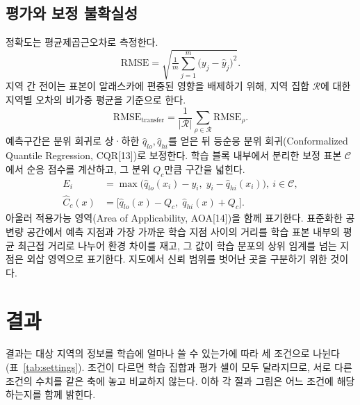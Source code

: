\documentclass[10pt,twocolumn]{article}
\begin{document}
\subsection{평가와 보정 불확실성}
정확도는 평균제곱근오차로 측정한다.
\begin{equation}
\mathrm{RMSE}=\sqrt{\tfrac1m\sum_{j=1}^{m}\big(y_j-\hat y_j\big)^2}.
\label{eq:rmse}
\end{equation}
지역 간 전이는 표본이 알래스카에 편중된 영향을 배제하기 위해, 지역 집합 $\mathcal R$에 대한 지역별 오차의 비가중 평균을 기준으로 한다.
\begin{equation}
\mathrm{RMSE}_{\mathrm{transfer}}=\frac{1}{|\mathcal R|}\sum_{\rho\in\mathcal R}\mathrm{RMSE}_{\rho}.
\label{eq:transfer}
\end{equation}
예측구간은 분위 회귀로 상·하한 $\hat q_{lo},\hat q_{hi}$를 얻은 뒤 등순응 분위 회귀(Conformalized Quantile Regression, CQR[13])로 보정한다. 학습 블록 내부에서 분리한 보정 표본 $\mathcal C$에서 순응 점수를 계산하고, 그 분위 $Q_c$만큼 구간을 넓힌다.
\begin{equation}
\begin{aligned}
E_i&=\max\big(\hat q_{lo}(x_i)-y_i,\;y_i-\hat q_{hi}(x_i)\big),\ i\in\mathcal C,\\
\hat C_c(x)&=\big[\hat q_{lo}(x)-Q_c,\;\hat q_{hi}(x)+Q_c\big].
\end{aligned}
\label{eq:cqr}
\end{equation}
아울러 적용가능 영역(Area of Applicability, AOA[14])을 함께 표기한다. 표준화한 공변량 공간에서 예측 지점과 가장 가까운 학습 지점 사이의 거리를 학습 표본 내부의 평균 최근접 거리로 나누어 환경 차이를 재고, 그 값이 학습 분포의 상위 임계를 넘는 지점은 외삽 영역으로 표기한다. 지도에서 신뢰 범위를 벗어난 곳을 구분하기 위한 것이다.


\section{결과}
결과는 대상 지역의 정보를 학습에 얼마나 쓸 수 있는가에 따라 세 조건으로 나뉜다(표~\ref{tab:settings}). 조건이 다르면 학습 집합과 평가 셀이 모두 달라지므로, 서로 다른 조건의 수치를 같은 축에 놓고 비교하지 않는다. 이하 각 절과 그림은 어느 조건에 해당하는지를 함께 밝힌다.
\end{document}
